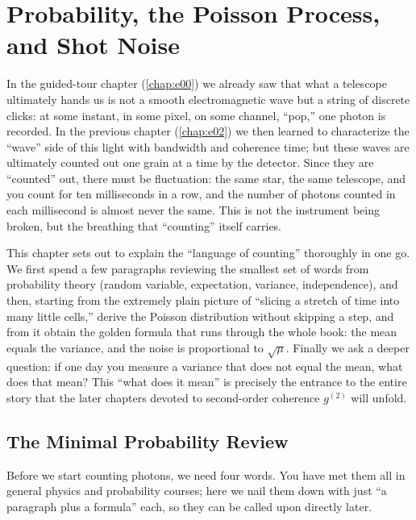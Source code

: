 \chapter{Probability, the Poisson Process, and Shot Noise}
\label{chap:e03}

\begin{chapteropening}
In the guided-tour chapter (\ref{chap:e00}) we already saw that what a telescope ultimately hands us is not a smooth electromagnetic wave but a string of discrete clicks: at some instant, in some pixel, on some channel, ``pop,'' one photon is recorded. In the previous chapter (\ref{chap:e02}) we then learned to characterize the ``wave'' side of this light with bandwidth and coherence time; but these waves are ultimately counted out one grain at a time by the detector. Since they are ``counted'' out, there must be fluctuation: the same star, the same telescope, and you count for ten milliseconds in a row, and the number of photons counted in each millisecond is almost never the same. This is not the instrument being broken, but the breathing that ``counting'' itself carries.

This chapter sets out to explain the ``language of counting'' thoroughly in one go. We first spend a few paragraphs reviewing the smallest set of words from probability theory (random variable, expectation, variance, independence), and then, starting from the extremely plain picture of ``slicing a stretch of time into many little cells,'' derive the Poisson distribution without skipping a step, and from it obtain the golden formula that runs through the whole book: the mean equals the variance, and the noise is proportional to $\sqrt{\mu}$. Finally we ask a deeper question: if one day you measure a variance that does not equal the mean, what does that mean? This ``what does it mean'' is precisely the entrance to the entire story that the later chapters devoted to second-order coherence $g^{(2)}$ will unfold.
\end{chapteropening}

\section{The Minimal Probability Review}
\label{sec:e03-review}

Before we start counting photons, we need four words. You have met them all in general physics and probability courses; here we nail them down with just ``a paragraph plus a formula'' each, so they can be called upon directly later.

